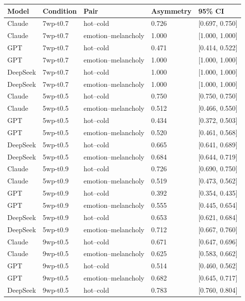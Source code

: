 \begin{longtable}[]{@{}lllll@{}}
\toprule\noalign{}
Model & Condition & Pair & Asymmetry & 95\% CI \\
\midrule\noalign{}
\endhead
\bottomrule\noalign{}
\endlastfoot
Claude & 7wp-t0.7 & hot--cold & 0.726 & {[}0.697, 0.750{]} \\
Claude & 7wp-t0.7 & emotion--melancholy & 1.000 & {[}1.000, 1.000{]} \\
GPT & 7wp-t0.7 & hot--cold & 0.471 & {[}0.414, 0.522{]} \\
GPT & 7wp-t0.7 & emotion--melancholy & 1.000 & {[}1.000, 1.000{]} \\
DeepSeek & 7wp-t0.7 & hot--cold & 1.000 & {[}1.000, 1.000{]} \\
DeepSeek & 7wp-t0.7 & emotion--melancholy & 1.000 & {[}1.000, 1.000{]} \\
Claude & 5wp-t0.5 & hot--cold & 0.750 & {[}0.750, 0.750{]} \\
Claude & 5wp-t0.5 & emotion--melancholy & 0.512 & {[}0.466, 0.550{]} \\
GPT & 5wp-t0.5 & hot--cold & 0.434 & {[}0.372, 0.503{]} \\
GPT & 5wp-t0.5 & emotion--melancholy & 0.520 & {[}0.461, 0.568{]} \\
DeepSeek & 5wp-t0.5 & hot--cold & 0.665 & {[}0.641, 0.689{]} \\
DeepSeek & 5wp-t0.5 & emotion--melancholy & 0.684 & {[}0.644, 0.719{]} \\
Claude & 5wp-t0.9 & hot--cold & 0.726 & {[}0.690, 0.750{]} \\
Claude & 5wp-t0.9 & emotion--melancholy & 0.519 & {[}0.473, 0.562{]} \\
GPT & 5wp-t0.9 & hot--cold & 0.392 & {[}0.354, 0.435{]} \\
GPT & 5wp-t0.9 & emotion--melancholy & 0.555 & {[}0.445, 0.654{]} \\
DeepSeek & 5wp-t0.9 & hot--cold & 0.653 & {[}0.621, 0.684{]} \\
DeepSeek & 5wp-t0.9 & emotion--melancholy & 0.712 & {[}0.667, 0.760{]} \\
Claude & 9wp-t0.5 & hot--cold & 0.671 & {[}0.647, 0.696{]} \\
Claude & 9wp-t0.5 & emotion--melancholy & 0.625 & {[}0.583, 0.662{]} \\
GPT & 9wp-t0.5 & hot--cold & 0.514 & {[}0.460, 0.562{]} \\
GPT & 9wp-t0.5 & emotion--melancholy & 0.682 & {[}0.645, 0.717{]} \\
DeepSeek & 9wp-t0.5 & hot--cold & 0.783 & {[}0.760, 0.804{]} \\

\end{longtable}
